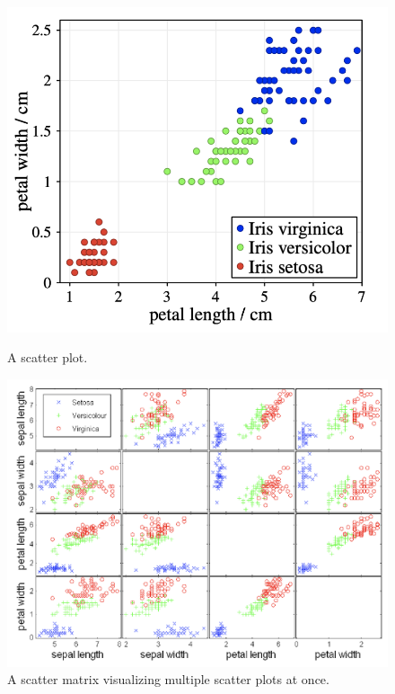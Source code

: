 \begin{figure}[h]
    \centering
    \begin{minipage}[b]{0.45\textwidth}
        \includegraphics[width=\textwidth]{img/scatter plot.png}
        \caption{A scatter plot.}
    \end{minipage}
    \hfill
    \begin{minipage}[b]{0.47\textwidth}
        \includegraphics[width=\textwidth]{img/scatter matrix.png}
        \caption{A scatter matrix visualizing multiple scatter plots at once.}
    \end{minipage}
\end{figure}

